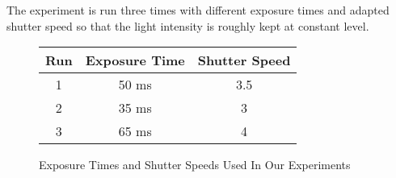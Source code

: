 The experiment is run three times with different exposure times and adapted shutter speed so that the light intensity is roughly kept at constant level. \\
\begin{figure}[H]
\centering
\begin{tabular}{ c | c | c }
Run & Exposure Time & Shutter Speed\\
  \hline                        
  1 & 50 ms & 3.5 \\
  2 & 35 ms & 3 \\
  3 & 65 ms & 4 \\
\end{tabular}
\label{tab:exposure}
\caption{Exposure Times and Shutter Speeds Used In Our Experiments}
\end{figure}

